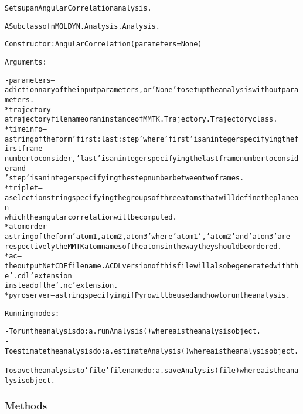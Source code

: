 \begin{alltt}
Sets up an Angular Correlation analysis.

A Subclass of nMOLDYN.Analysis.Analysis. 

Constructor: AngularCorrelation({\textbar}parameters{\textbar} = None)

Arguments:

    - {\textbar}parameters{\textbar} -- a dictionnary of the input parameters, or 'None' to set up the analysis without parameters.
        * trajectory      -- a trajectory file name or an instance of MMTK.Trajectory.Trajectory class.
        * timeinfo        -- a string of the form 'first:last:step' where 'first' is an integer specifying the first frame 
                             number to consider, 'last' is an integer specifying the last frame number to consider and 
                             'step' is an integer specifying the step number between two frames.
        * triplet         -- a selection string specifying the groups of three atoms that will define the plane on 
                             which the angular correlation will be computed.
        * atomorder       -- a string of the form 'atom1,atom2,atom3' where 'atom1', 'atom2' and 'atom3' are 
                             respectively the MMTK atom names of the atoms in the way they should be ordered.
        * ac              -- the output NetCDF file name. A CDL version of this file will also be generated with the '.cdl' extension
                             instead of the '.nc' extension.
        * pyroserver      -- a string specifying if Pyro will be used and how to run the analysis.
    
Running modes:

    - To run the analysis do: a.runAnalysis() where a is the analysis object.
    - To estimate the analysis do: a.estimateAnalysis() where a is the analysis object.
    - To save the analysis to 'file' file name do: a.saveAnalysis(file) where a is the analysis object.
\end{alltt}



  \subsubsection{Methods}

